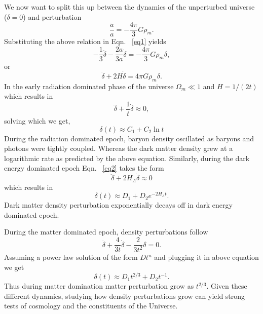 We now want to split this up between the dynamics of the unperturbed universe ($\delta =0 $) and perturbation
\begin{equation}
\frac{\ddot{a}}{a}  = -\frac{4 \pi}{3} G\rho_{m}.
\end{equation}
Substituting the above relation in Eqn. ~\ref{eq1} yields 
\begin{equation}
- \frac{1}{3}\ddot{\delta} - \frac{2\dot{a}}{3a} \dot{\delta}  = -\frac{4 \pi}{3} G\rho_{m}\delta,
\end{equation}
or
\begin{equation}
\ddot{\delta} + 2 H\dot{\delta} = 4\pi G \rho_{m} \delta.
\end{equation}
In the early radiation dominated phase of the universe $\Omega_{m} \ll 1$ and $H = 1/(2t)$ which results in 
\begin{equation}
\ddot{\delta} + \frac{1}{t} \dot{\delta} \approx 0,
\end{equation}
solving which we get,
\begin{equation}
\delta(t) \approx C_{1} + C_{2} \ln t
\end{equation}
During the radiation dominated epoch, baryon density oscillated as baryons and photons were tightly coupled. 
Whereas the dark matter density grew at a logarithmic rate as predicted by the above equation.  
Similarly, during the dark energy dominated epoch Eqn. ~\ref{eq2} takes the form
\begin{equation}
\ddot{\delta} + 2 H_{\Lambda} \dot{\delta} \approx 0
\end{equation}
which results in
\begin{equation}
\delta(t) \approx D_{1} + D_{2}e^{-2H_{\Lambda} t}.
\end{equation}
Dark matter density perturbation exponentially decays off in dark energy dominated epoch. 


During the matter dominated epoch, density perturbations follow
\begin{equation}
\ddot{\delta} + \frac{4}{3t} \dot{\delta} -\frac{2}{3t^{2}} \delta = 0.
\end{equation}  
Assuming a power law solution of the form $Dt^{n}$  and plugging it in above equation we get
\begin{equation}
\delta(t) \approx D_{1} t^{2/3} + D_{2} t^{-1}.
\end{equation}
Thus during matter domination matter perturbation grow as $t^{2/3}$. Given these different dynamics, studying how density perturbations grow can yield strong tests of cosmology and the constituents of the Universe. 
